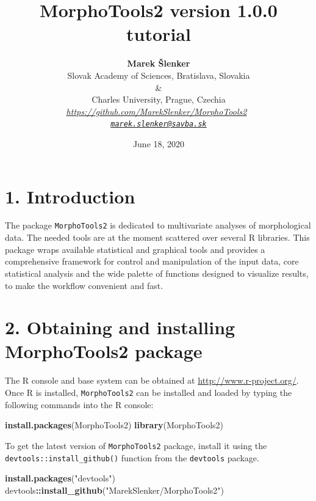\documentclass[
]{article}
\title{\vspace{-1.5cm} MorphoTools2 version 1.0.0 tutorial}
\author{\textbf{Marek Šlenker} \vspace*{0.5pc}\\
Slovak Academy of Sciences, Bratislava, Slovakia\\
\&\\
Charles University, Prague, Czechia \vspace*{0.5pc}\\
\emph{\url{https://github.com/MarekSlenker/MorphoTools2}}~\\
\emph{\href{mailto:marek.slenker@savba.sk}{\nolinkurl{marek.slenker@savba.sk}}}}
\date{June 18, 2020}
\newenvironment{Shaded}{\begin{snugshade}}{\end{snugshade}}
\newcommand{\KeywordTok}[1]{\textcolor[rgb]{0.13,0.29,0.53}{\textbf{#1}}}
\newcommand{\NormalTok}[1]{#1}
\newcommand{\OperatorTok}[1]{\textcolor[rgb]{0.81,0.36,0.00}{\textbf{#1}}}
\newcommand{\StringTok}[1]{\textcolor[rgb]{0.31,0.60,0.02}{#1}}
\begin{document}
\maketitle

\tableofcontents \vspace*{-1pc}

\hypertarget{introduction}{%
\section{1. Introduction}\label{introduction}}

The package \texttt{MorphoTools2} is dedicated to multivariate analyses
of morphological data. The needed tools are at the moment scattered over
several R libraries. This package wraps available statistical and
graphical tools and provides a comprehensive framework for control and
manipulation of the input data, core statistical analysis and the wide
palette of functions designed to visualize results, to make the workflow
convenient and fast.

\hypertarget{obtaining-and-installing-morphotools2-package}{%
\section{2. Obtaining and installing MorphoTools2
package}\label{obtaining-and-installing-morphotools2-package}}

The R console and base system can be obtained at
\url{http://www.r-project.org/}. Once R is installed,
\texttt{MorphoTools2} can be installed and loaded by typing the
following commands into the R console:

\begin{Shaded}
\begin{Highlighting}[]
\KeywordTok{install.packages}\NormalTok{(MorphoTools2)}
\KeywordTok{library}\NormalTok{(MorphoTools2)}
\end{Highlighting}
\end{Shaded}

To get the latest version of \texttt{MorphoTools2} package, install it
using the \texttt{devtools::install\_github()} function from the
\texttt{devtools} package.

\begin{Shaded}
\begin{Highlighting}[]
\KeywordTok{install.packages}\NormalTok{(}\StringTok{"devtools"}\NormalTok{)}
\NormalTok{devtools}\OperatorTok{::}\KeywordTok{install_github}\NormalTok{(}\StringTok{"MarekSlenker/MorphoTools2"}\NormalTok{)}
\end{Highlighting}
\end{Shaded}
\end{document}
